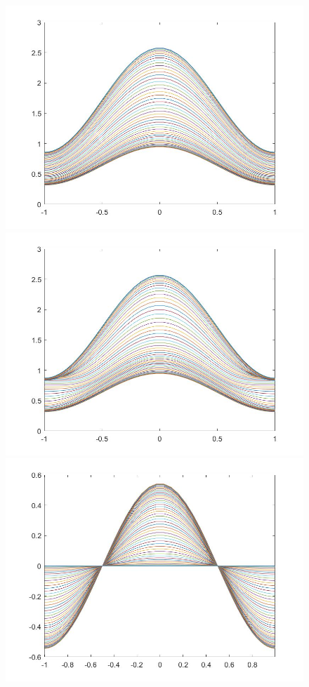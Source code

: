 \documentclass[11pt, a4paper]{article}
\theoremstyle{definition}
\begin{document}
\begin{figure}[h]
	\includegraphics[scale=0.3]{Nexprho1.jpg}
	\includegraphics[scale=0.3]{Nexprho2.jpg}
	\includegraphics[scale=0.3]{Nexpp1.jpg}

\end{figure}
\end{document}
